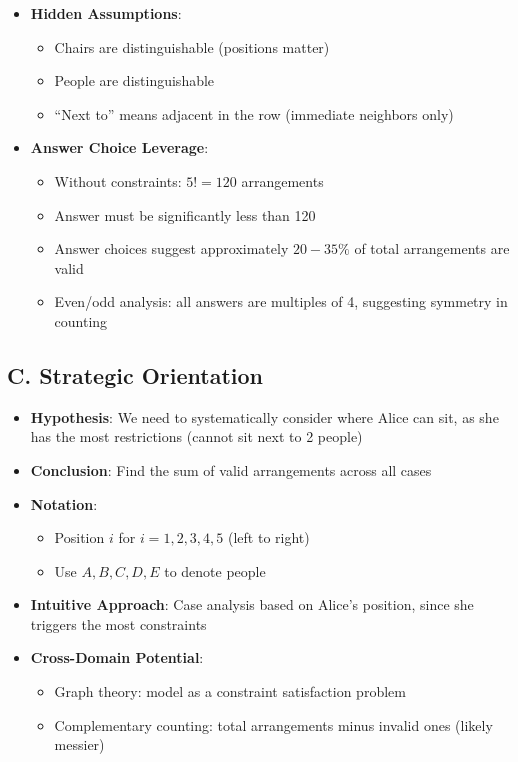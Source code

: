 \documentclass[]{article}
\begin{document}
\begin{problemconfigbox}
\begin{itemize}[leftmargin=*]
    \item \textbf{Hidden Assumptions}: 
    \begin{itemize}
        \item Chairs are distinguishable (positions matter)
        \item People are distinguishable
        \item ``Next to'' means adjacent in the row (immediate neighbors only)
    \end{itemize}
    
    \item \textbf{Answer Choice Leverage}: 
    \begin{itemize}
        \item Without constraints: $5! = 120$ arrangements
        \item Answer must be significantly less than 120
        \item Answer choices suggest approximately $20-35\%$ of total arrangements are valid
        \item Even/odd analysis: all answers are multiples of 4, suggesting symmetry in counting
    \end{itemize}
\end{itemize}

\subsection*{C. Strategic Orientation}
\begin{itemize}[leftmargin=*]
    \item \textbf{Hypothesis}: We need to systematically consider where Alice can sit, as she has the most restrictions (cannot sit next to 2 people)
    
    \item \textbf{Conclusion}: Find the sum of valid arrangements across all cases
    
    \item \textbf{Notation}: 
    \begin{itemize}
        \item Position $i$ for $i = 1, 2, 3, 4, 5$ (left to right)
        \item Use $A, B, C, D, E$ to denote people
    \end{itemize}
    
    \item \textbf{Intuitive Approach}: Case analysis based on Alice's position, since she triggers the most constraints
    
    \item \textbf{Cross-Domain Potential}: 
    \begin{itemize}
        \item Graph theory: model as a constraint satisfaction problem
        \item Complementary counting: total arrangements minus invalid ones (likely messier)
    \end{itemize}
\end{itemize}
\end{problemconfigbox}
\end{document}
